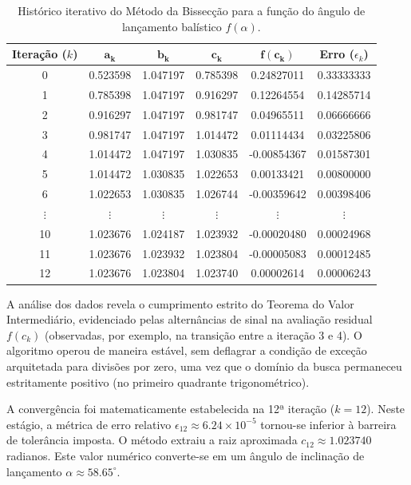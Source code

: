 \begin{table}[htpb]
\centering
\caption{Histórico iterativo do Método da Bissecção para a função do ângulo de lançamento balístico $f(\alpha)$.}
\label{tab:bisseccao_missil}
\small
\begin{tabular}{@{}cccccc@{}}
\toprule
\textbf{Iteração ($k$)} & $\mathbf{a_k}$ & $\mathbf{b_k}$ & $\mathbf{c_k}$ & $\mathbf{f(c_k)}$ & \textbf{Erro} ($\epsilon_k$) \\ \midrule
0  & 0.523598 & 1.047197 & 0.785398 & \phantom{-}0.24827011 & 0.33333333 \\
1  & 0.785398 & 1.047197 & 0.916297 & \phantom{-}0.12264554 & 0.14285714 \\
2  & 0.916297 & 1.047197 & 0.981747 & \phantom{-}0.04965511 & 0.06666666 \\
3  & 0.981747 & 1.047197 & 1.014472 & \phantom{-}0.01114434 & 0.03225806 \\
4  & 1.014472 & 1.047197 & 1.030835 & -0.00854367           & 0.01587301 \\
5  & 1.014472 & 1.030835 & 1.022653 & \phantom{-}0.00133421 & 0.00800000 \\
6  & 1.022653 & 1.030835 & 1.026744 & -0.00359642           & 0.00398406 \\
$\vdots$ & $\vdots$ & $\vdots$ & $\vdots$ & $\vdots$          & $\vdots$   \\
10 & 1.023676 & 1.024187 & 1.023932 & -0.00020480           & 0.00024968 \\
11 & 1.023676 & 1.023932 & 1.023804 & -0.00005083           & 0.00012485 \\
12 & 1.023676 & 1.023804 & 1.023740 & \phantom{-}0.00002614 & 0.00006243 \\ \bottomrule
\end{tabular}
\end{table}
\vspace{1cm}

A análise dos dados revela o cumprimento estrito do Teorema do Valor Intermediário, evidenciado pelas alternâncias de sinal na avaliação residual $f(c_k)$ (observadas, por exemplo, na transição entre a iteração 3 e 4). O algoritmo operou de maneira estável, sem deflagrar a condição de exceção arquitetada para divisões por zero, uma vez que o domínio da busca permaneceu estritamente positivo (no primeiro quadrante trigonométrico).

A convergência foi matematicamente estabelecida na 12ª iteração ($k=12$). Neste estágio, a métrica de erro relativo $\epsilon_{12} \approx 6.24 \times 10^{-5}$ tornou-se inferior à barreira de tolerância imposta. O método extraiu a raiz aproximada $c_{12} \approx 1.023740$ radianos. Este valor numérico converte-se em um ângulo de inclinação de lançamento $\alpha \approx 58.65^\circ$.

